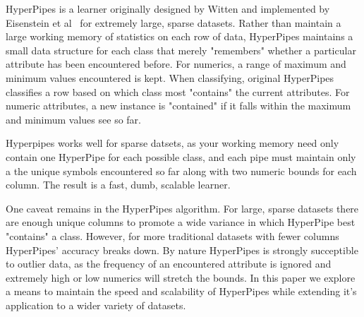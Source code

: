 HyperPipes is a learner originally designed by Witten\cite{Witten99} and implemented by Eisenstein et al~\cite{Eisenstein04} for extremely large, sparse datasets. Rather than maintain a large working memory of statistics on each row of data, HyperPipes maintains a small data structure for each class that merely "remembers" whether a particular attribute has been encountered before. For numerics, a range of maximum and minimum values encountered is kept. When classifying, original HyperPipes classifies a row based on which class most "contains" the current attributes. For numeric attributes, a new instance is "contained" if it falls within the maximum and minimum values see so far.

Hyperpipes works well for sparse datsets, as your working memory need only contain one HyperPipe for each possible class, and each pipe must maintain only a the unique symbols encountered so far along with two numeric bounds for each column. The result is a fast, dumb, scalable learner.

One caveat remains in the HyperPipes algorithm. For large, sparse datasets there are enough unique columns to promote a wide variance in which HyperPipe best "contains" a class. However, for more traditional datasets with fewer columns HyperPipes' accuracy breaks down. By nature HyperPipes is strongly succeptible to outlier data, as the frequency of an encountered attribute is ignored and extremely high or low numerics will stretch the bounds. In this paper we explore a means to maintain the speed and scalability of HyperPipes while extending it's application to a wider variety of datasets.
